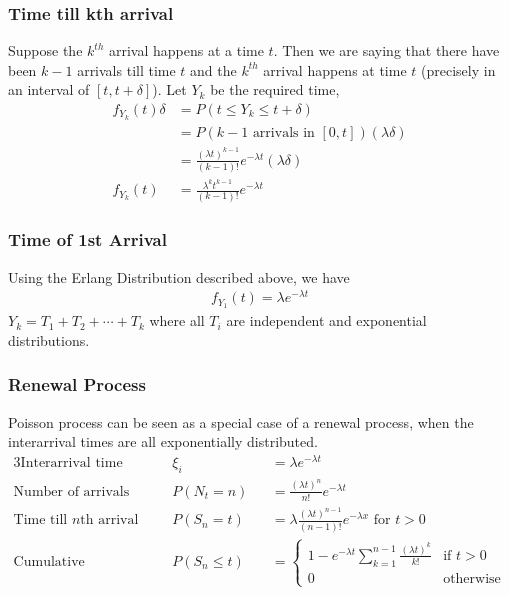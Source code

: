 \documentclass[../../probability-notes.tex]{subfiles}
\begin{document}
    \subsubsection{Time till kth arrival}
    Suppose the $k^{th}$ arrival happens at a time $t$. Then we are saying that there have been $k-1$ arrivals till time $t$ and the $k^{th}$ arrival happens at time $t$ (precisely in an interval of $[t, t+\delta]$). Let $Y_{k}$ be the required time,
    \begin{align*}
        f_{Y_{k}}(t)\delta &= P(t \leq Y_{k} \leq t+\delta)\\
                    &= P(\text{$k-1$ arrivals  in $[0,t]$}) (\lambda \delta)\\
                    &= \frac{(\lambda t)^{k-1}}{(k-1)!}e^{-\lambda t}(\lambda \delta)\\
        f_{Y_{k}}(t) &= \frac{\lambda^{k} t^{k-1}}{(k-1)!}e^{-\lambda t} \tag*{Erlang Distribution}
    \end{align*}

    \subsubsection{Time of 1st Arrival}
    Using the Erlang Distribution described above, we have
    \begin{align*}
        f_{Y_{1}}(t) = \lambda e^{-\lambda t}
    \end{align*}
    $Y_{k} = T_{1} + T_{2} + \cdots + T_{k}$ where all $T_{i}$ are independent and exponential distributions.


    \subsubsection{Renewal Process}
    Poisson process can be seen as a special case of a renewal process, when the interarrival times are all exponentially distributed.
    \begin{alignat*}{3}
        \text{Interarrival time }& \xi_{i}&& = \lambda e^{-\lambda t}\\
        \text{Number of arrivals }& P(N_{t} = n)&& = \frac{(\lambda t)^{n}}{n!} e^{-\lambda t}\\
        \text{Time till $n$th arrival }& P(S_{n} = t)&& = \lambda \frac{(\lambda t)^{n-1}}{(n-1)!} e^{-\lambda x} \text{ for $t > 0$}\\
        \text{Cumulative distribution }& P(S_{n} \leq t)&& = \begin{cases} 1 - e^{-\lambda t} \sum_{k=1}^{n-1} \frac{(\lambda t)^{k}}{k!} &\mbox{if $t > 0$}\\
        0 &\mbox{otherwise} \end{cases}
    \end{alignat*}
\end{document}
